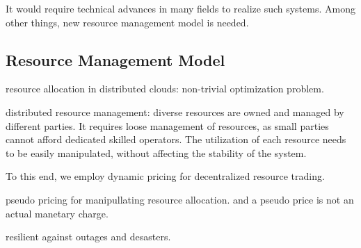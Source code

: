 It would require technical advances in many fields to realize such
systems.
Among other things, new resource management model is needed.



\subsection{Resource Management Model}

resource allocation in distributed clouds: non-trivial optimization
problem.

distributed resource management: diverse resources are owned and
managed by different parties.
It requires loose management of resources, as small parties cannot
afford dedicated skilled operators.
The utilization of each resource needs to be easily manipulated,
without affecting the stability of the system.

To this end, we employ dynamic pricing for decentralized resource
trading.

pseudo pricing for manipullating resource allocation.
and a pseudo price is not an actual manetary charge.

resilient against outages and desasters.


